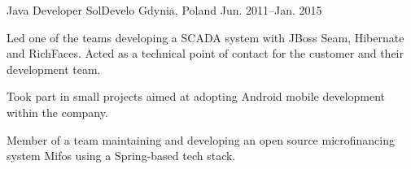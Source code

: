 \begin{cventries}
  \cventry
    {Java Developer} %
    {SolDevelo} %
    {Gdynia, Poland} %
    {Jun. 2011–Jan. 2015} %
    {
      \begin{cvitems} %
        \item {Led one of the teams developing a SCADA system with JBoss Seam, Hibernate and RichFaces. Acted as a technical point of contact for the customer and their development team.}
        \item {Took part in small projects aimed at adopting Android mobile development within the company.}
        \item {Member of a team maintaining and developing an open source microfinancing system Mifos using a Spring-based tech stack.}
      \end{cvitems}
    }

\end{cventries}
